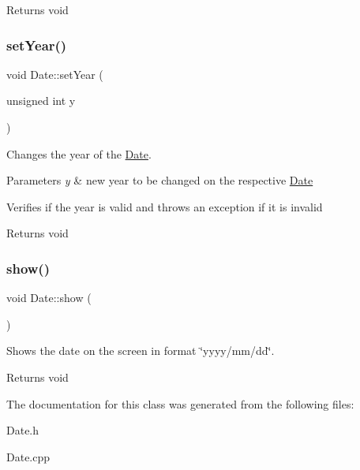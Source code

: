 \begin{DoxyReturn}{Returns}
void 
\end{DoxyReturn}
\mbox{\label{class_date_a12214ddd7d5aa3d614d8a068b9701bc4}} 
\subsubsection{\texorpdfstring{set\+Year()}{setYear()}}
{\footnotesize\ttfamily void Date\+::set\+Year (\begin{DoxyParamCaption}\item[{unsigned int}]{y }\end{DoxyParamCaption})}



Changes the year of the \hyperlink{class_date}{Date}. 


\begin{DoxyParams}{Parameters}
{\em y} & new year to be changed on the respective \hyperlink{class_date}{Date}\\
\hline
\end{DoxyParams}
Verifies if the year is valid and throws an exception if it is invalid

\begin{DoxyReturn}{Returns}
void 
\end{DoxyReturn}
\mbox{\label{class_date_addaed921af229dffeb35ef7ef30bff29}} 
\subsubsection{\texorpdfstring{show()}{show()}}
{\footnotesize\ttfamily void Date\+::show (\begin{DoxyParamCaption}{ }\end{DoxyParamCaption})}



Shows the date on the screen in format \char`\"{}yyyy/mm/dd\char`\"{}. 

\begin{DoxyReturn}{Returns}
void 
\end{DoxyReturn}


The documentation for this class was generated from the following files\+:\begin{DoxyCompactItemize}
\item 
Date.\+h\item 
Date.\+cpp\end{DoxyCompactItemize}
